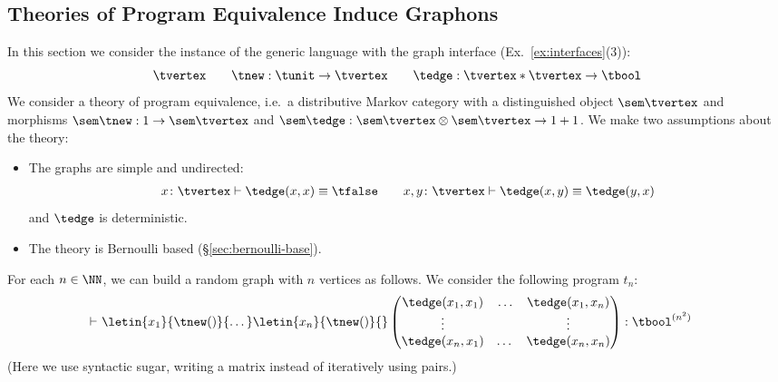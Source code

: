 \subsection{Theories of Program Equivalence Induce Graphons}
\label{sec:program-equivalence-graphons}
In this section we consider the instance of the generic language with the graph interface
(Ex.~\ref{ex:interfaces}(3)):
\[
  \tvertex\qquad
  \tnew : \tunit \to \tvertex\qquad
  \tedge:\tvertex\ast\tvertex\to \tbool
\]
We consider a theory of program equivalence, i.e.~a distributive Markov
category with a distinguished object $\sem\tvertex$
and morphisms $\sem \tnew :1\to \sem \tvertex$ and $\sem \tedge:\sem \tvertex\otimes
\sem \tvertex\to 1+1$.
We make two assumptions about the theory:
\begin{itemize}
\item  The graphs are simple and undirected:
\begin{equation}
  \begin{aligned}
  x\colon \tvertex \vdash \tedge(x,x)\equiv \tfalse
\qquad x,y\colon \tvertex \vdash \tedge(x,y)\equiv \tedge(y,x)
\end{aligned}\label{eqn:simplegraph}\end{equation}
and $\tedge$ is deterministic.
\item The theory is Bernoulli based (\S\ref{sec:bernoulli-base}).\end{itemize}
For each $n\in\NN$, we can build a
random graph with $n$ vertices as follows.
We consider the following  program $t_n$:
\begin{equation}\begin{aligned}
\vdash\ & \letin {x_1}{\tnew()}{
        \dots {} }\letin {x_n}{\tnew()}{}
    \begin{pmatrix}\tedge (x_1,x_1)&{\dots}&\tedge (x_1,x_n)
\\
\vdots &&{\vdots}\\
\tedge(x_n,x_1)&\dots &\tedge(x_n,x_n)\end{pmatrix}:\tbool^{(n^2)}
\end{aligned}\label{eqn:programgraph}\end{equation}
(Here we use syntactic sugar, writing a matrix instead of iteratively using pairs.)

